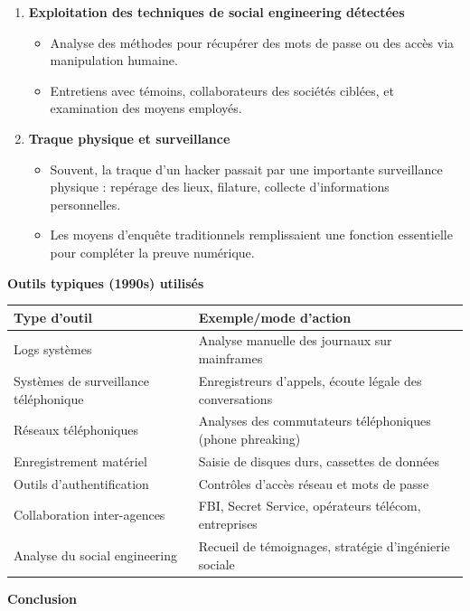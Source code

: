 \documentclass[12pt, a4paper]{article}
\begin{document}
\begin{enumerate}[label=\textbf{\arabic*.}, start=6]
\begin{enumerate}
			\item \textbf{Exploitation des techniques de social engineering détectées}
			\begin{itemize}
				\item Analyse des méthodes pour récupérer des mots de passe ou des accès via manipulation humaine.
				\item Entretiens avec témoins, collaborateurs des sociétés ciblées, et examination des moyens employés.
			\end{itemize}
			
			\item \textbf{Traque physique et surveillance}
			\begin{itemize}
				\item Souvent, la traque d'un hacker passait par une importante surveillance physique : repérage des lieux, filature, collecte d'informations personnelles.
				\item Les moyens d'enquête traditionnels remplissaient une fonction essentielle pour compléter la preuve numérique.
			\end{itemize}
		\end{enumerate}
		
		\textbf{Outils typiques (1990s) utilisés}
		
		\begin{tabular}{|p{5cm}|p{8cm}|}
			\hline
			\textbf{Type d'outil} & \textbf{Exemple/mode d'action} \\
			\hline
			Logs systèmes & Analyse manuelle des journaux sur mainframes \\
			\hline
			Systèmes de surveillance téléphonique & Enregistreurs d'appels, écoute légale des conversations \\
			\hline
			Réseaux téléphoniques & Analyses des commutateurs téléphoniques (phone phreaking) \\
			\hline
			Enregistrement matériel & Saisie de disques durs, cassettes de données \\
			\hline
			Outils d'authentification & Contrôles d'accès réseau et mots de passe \\
			\hline
			Collaboration inter-agences & FBI, Secret Service, opérateurs télécom, entreprises \\
			\hline
			Analyse du social engineering & Recueil de témoignages, stratégie d'ingénierie sociale \\
			\hline
		\end{tabular}
		
		\textbf{Conclusion}
		

\end{enumerate}
\end{document}
